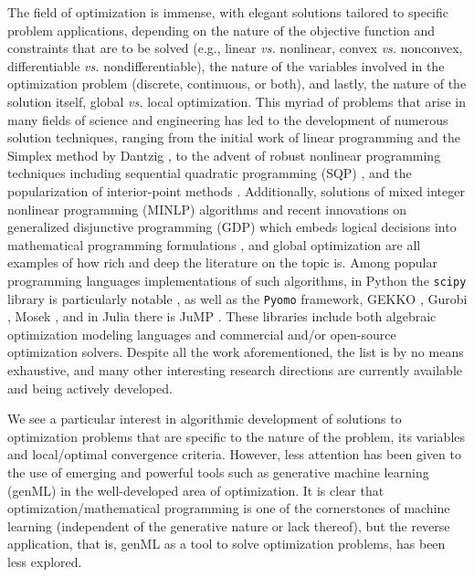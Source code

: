 \documentclass{achemso}
\begin{document}
The field of optimization is immense, with elegant solutions tailored to specific problem applications, depending on the nature of the objective function and constraints that are to be solved (e.g., linear \emph{vs.} nonlinear, convex \emph{vs.} nonconvex, differentiable \emph{vs.} nondifferentiable), the nature of the variables involved in the optimization problem (discrete, continuous, or both), and lastly, the nature of the solution itself, global \emph{vs.} local optimization. This myriad of problems that arise in many fields of science and engineering has led to the development of numerous solution techniques, ranging from the initial work of linear programming and the Simplex method by Dantzig \cite{dantzig1990origins}, to the advent of robust nonlinear programming techniques including sequential quadratic programming (SQP) \cite{Han1977,powell_sqp_1978,Wilson1963Simplicial}, and the popularization of interior-point methods \cite{wachter2006implementation}. Additionally, solutions of mixed integer nonlinear programming (MINLP) algorithms \cite{bonami2008} and recent innovations on generalized disjunctive programming (GDP) which embeds logical decisions into mathematical programming formulations \cite{grossmann_gdp}, and global optimization \cite{FLOUDAS20051185,Floudas2009,BOUKOUVALA2016701} are all examples of how rich and deep the literature on the topic is. Among popular programming languages implementations of such algorithms, in Python the \texttt{scipy} library is particularly notable \cite{virtanen-2020-scipy}, as well as the \texttt{Pyomo} \cite{bynum-2021-pyomo-optim} framework, GEKKO \cite{beal-2018-gekko-optim-suite}, Gurobi \cite{gurobi}, Mosek \cite{Andersen2000}, and in Julia there is JuMP \cite{dunning-2017-jump}. These libraries include both algebraic optimization modeling languages and commercial and/or open-source optimization solvers. Despite all the work aforementioned, the list is by no means exhaustive, and many other interesting research directions are currently available and being actively developed.

We see a particular interest in algorithmic development of solutions to optimization problems that are specific to the nature of the problem, its variables and local/optimal convergence criteria. However, less attention has been given to the use of emerging and powerful tools such as generative machine learning (genML) in the well-developed area of optimization. It is clear that optimization/mathematical programming is one of the cornerstones of machine learning (independent of the generative nature or lack thereof), but the reverse application, that is, genML as a tool to solve optimization problems, has been less explored.
\end{document}
